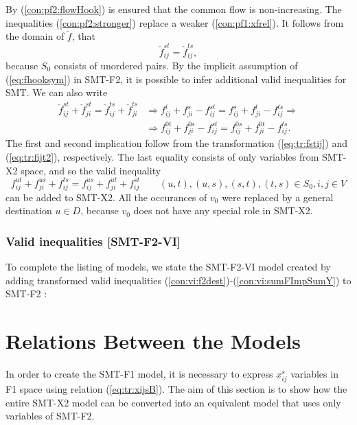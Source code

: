 By (\ref{con:pf2:flowHook}) is ensured that the common flow is non-increasing. The inequalities (\ref{con:pf2:stronger}) replace a weaker (\ref{con:pf1:xfrel}). It follows from the domain of $\check{f}$, that 
\begin{equation}
\label{eq:fhooksym}
\check{f}_{ij}^{st}=\check{f}_{ij}^{ts},
\end{equation}
because $S_0$ consists of unordered pairs. By the implicit assumption of (\ref{eq:fhooksym}) in SMT-F2, it is possible to infer additional valid inequalities for SMT. We can also write
\begin{align*}
\check{f}^{st}_{ij}+\check{f}^{st}_{ji}=\check{f}^{ts}_{ij}+\check{f}^{ts}_{ji} &\Rightarrow f^t_{ij}+f^s_{ji}-f^{st}_{ij}=f^s_{ij}+f^t_{ji}-f^{ts}_{ij}\Rightarrow \\ & \Rightarrow f^{0t}_{ij}+f^{0s}_{ji}-f^{st}_{ij}=f^{0s}_{ij}+f^{0t}_{ji}-f^{ts}_{ij}.
\end{align*}
The first and second implication follow from the transformation (\ref{eq:tr:fstij}) and (\ref{eq:tr:fijt2}), respectively. The last equality consists of only variables from SMT-X2  space, and so the valid inequality
\begin{equation*}f^{ut}_{ij}+f^{us}_{ji}+f^{ts}_{ij}=f^{us}_{ij}+f^{ut}_{ji}+f^{st}_{ij} \quad\quad (u,t),(u,s),(s,t),(t,s)\in S_0, i,j\in V
\end{equation*} 
can be added to  SMT-X2. All the occurances of $v_0$ were replaced by a general destination $u\in D$, because $v_0$ does not have any special role in SMT-X2.

\subsubsection{Valid inequalities [SMT-F2-VI]}

To complete the listing of models, we state the SMT-F2-VI model created by adding transformed valid inequalities (\ref{con:vi:f2dest})-(\ref{con:vi:sumFImpSumY}) to SMT-F2 :

\section{Relations Between the Models}
\label{sec:comp}
In order to create the SMT-F1 model, it is necessary to express $x^s_{ij}$ variables in F1 space using relation (\ref{eq:tr:xijsB}). The aim of this section is to show how the entire SMT-X2 model can be converted into an equivalent model that uses only variables of SMT-F2. 

